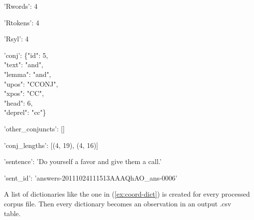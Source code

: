 \begin{exe}
\begin{multicols}{2}
'Rwords': 4

'Rtokens': 4

'Rsyl': 4
\end{multicols}
\begin{multicols}{2}
'conj': \{"id": 5,\\\hspace{.5cm}
  "text": "and",\\\hspace{.5cm}
  "lemma": "and",\\\hspace{.5cm}
  "upos": "CCONJ",\\\hspace{.5cm}
  "xpos": "CC",\\\hspace{.5cm}
  "head": 6,\\\hspace{.5cm}
  "deprel": "cc"\}

'other\_conjuncts': []

'conj\_lengths': [(4, 19), (4, 16)]

'sentence': 'Do yourself a favor and give them a call.'

'sent\_id': 'answers-20111024111513AAAQhAO\_ans-0006'
\end{multicols}
\end{exe}

A list of dictionaries like the one in (\ref{ex:coord-dict}) is created for every processed corpus file. Then every dictionary becomes an observation in an output .csv table. 

